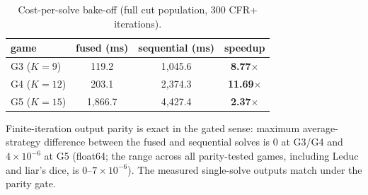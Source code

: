 \documentclass[11pt]{article}
\begin{document}
\begin{table}[t]
\centering
\caption{Cost-per-solve bake-off (full cut population, 300 CFR+ iterations).}
\label{tab:bakeoff}
\begin{tabular}{lccc}
\toprule
game & fused (ms) & sequential (ms) & speedup \\
\midrule
G3 ($K{=}9$) & 119.2 & 1,045.6 & \textbf{8.77$\times$} \\
G4 ($K{=}12$) & 203.1 & 2,374.3 & \textbf{11.69$\times$} \\
G5 ($K{=}15$) & 1,866.7 & 4,427.4 & \textbf{2.37$\times$} \\
\bottomrule
\end{tabular}
\end{table}

Finite-iteration output parity is exact in the gated sense: maximum average-strategy
difference between the fused and sequential solves is $0$ at G3/G4 and
$4\times10^{-6}$ at G5 (float64; the range across all parity-tested games, including
Leduc and liar's dice, is $0$--$7\times10^{-6}$). The measured single-solve outputs
match under the parity gate.
\end{document}
